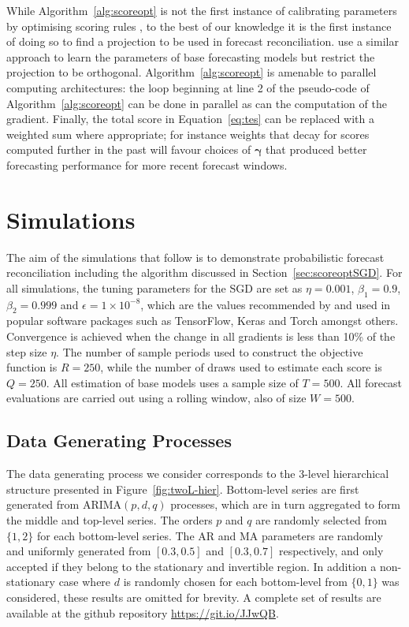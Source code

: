 \documentclass[a4paper,12pt]{article}
\theoremstyle{definition}
\begin{document}
While Algorithm~\ref{alg:scoreopt} is not the first instance of calibrating parameters by optimising scoring rules \citep[see][for an earlier example]{gneiting2005}, to the best of our knowledge it is the first instance of doing so to find a projection to be used in forecast reconciliation. \cite{RanEtAl2021} use a similar approach to learn the parameters of base forecasting models but restrict the projection to be orthogonal. Algorithm~\ref{alg:scoreopt} is amenable to parallel computing architectures: the loop beginning at line 2 of the pseudo-code of Algorithm~\ref{alg:scoreopt} can be done in parallel as can the computation of the gradient. Finally, the total score in Equation~\eqref{eq:tes} can be replaced with a weighted sum where appropriate; for instance weights that decay for scores computed further in the past will favour choices of $\bm{\gamma}$ that produced better forecasting performance for more recent forecast windows.

\section{Simulations}\label{sec:simulations}

The aim of the simulations that follow is to demonstrate probabilistic forecast reconciliation including the algorithm discussed in Section~\ref{sec:scoreoptSGD}. For all simulations, the tuning parameters for the SGD are set as $\eta=0.001$, $\beta_1=0.9$, $\beta_2=0.999$ and $\epsilon=1\times 10^{-8}$, which are the values recommended by \cite{kingma2014} and used in popular software packages such as TensorFlow, Keras and Torch amongst others. Convergence is achieved when the change in all gradients is less than 10\% of the step size $\eta$. The number of sample periods used to construct the objective function is $R=250$, while the number of draws used to estimate each score is $Q=250$. All estimation of base models uses a sample size of $T=500$. All forecast evaluations are carried out using a rolling window, also of size $W=500$.

\subsection{Data Generating Processes}\label{sec:dgp}

The data generating process we consider corresponds to the 3-level hierarchical structure presented in Figure~\ref{fig:twoL-hier}. Bottom-level series are first generated from ARIMA$(p,d,q)$ processes, which are in turn aggregated to form the middle and top-level series. The orders $p$ and $q$ are randomly selected from $\{1,2\}$ for each bottom-level series. The AR and MA parameters are randomly and uniformly generated from $[0.3,0.5]$ and $[0.3,0.7]$ respectively, and only accepted if they belong to the stationary and invertible region. In addition a non-stationary case where $d$ is randomly chosen for each bottom-level from $\{0,1\}$ was considered, these results are omitted for brevity. A complete set of results are available at the github repository \url{https://git.io/JJwQB}.
\end{document}
